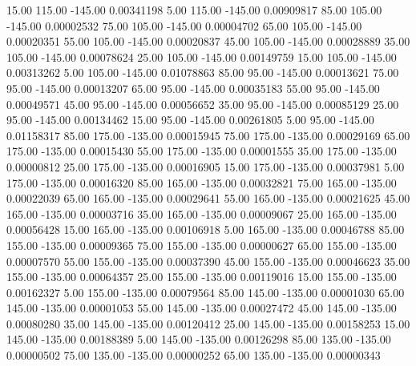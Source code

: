      15.00    115.00   -145.00     0.00341198
      5.00    115.00   -145.00     0.00909817
     85.00    105.00   -145.00     0.00002532
     75.00    105.00   -145.00     0.00004702
     65.00    105.00   -145.00     0.00020351
     55.00    105.00   -145.00     0.00020837
     45.00    105.00   -145.00     0.00028889
     35.00    105.00   -145.00     0.00078624
     25.00    105.00   -145.00     0.00149759
     15.00    105.00   -145.00     0.00313262
      5.00    105.00   -145.00     0.01078863
     85.00     95.00   -145.00     0.00013621
     75.00     95.00   -145.00     0.00013207
     65.00     95.00   -145.00     0.00035183
     55.00     95.00   -145.00     0.00049571
     45.00     95.00   -145.00     0.00056652
     35.00     95.00   -145.00     0.00085129
     25.00     95.00   -145.00     0.00134462
     15.00     95.00   -145.00     0.00261805
      5.00     95.00   -145.00     0.01158317
     85.00    175.00   -135.00     0.00015945
     75.00    175.00   -135.00     0.00029169
     65.00    175.00   -135.00     0.00015430
     55.00    175.00   -135.00     0.00001555
     35.00    175.00   -135.00     0.00000812
     25.00    175.00   -135.00     0.00016905
     15.00    175.00   -135.00     0.00037981
      5.00    175.00   -135.00     0.00016320
     85.00    165.00   -135.00     0.00032821
     75.00    165.00   -135.00     0.00022039
     65.00    165.00   -135.00     0.00029641
     55.00    165.00   -135.00     0.00021625
     45.00    165.00   -135.00     0.00003716
     35.00    165.00   -135.00     0.00009067
     25.00    165.00   -135.00     0.00056428
     15.00    165.00   -135.00     0.00106918
      5.00    165.00   -135.00     0.00046788
     85.00    155.00   -135.00     0.00009365
     75.00    155.00   -135.00     0.00000627
     65.00    155.00   -135.00     0.00007570
     55.00    155.00   -135.00     0.00037390
     45.00    155.00   -135.00     0.00046623
     35.00    155.00   -135.00     0.00064357
     25.00    155.00   -135.00     0.00119016
     15.00    155.00   -135.00     0.00162327
      5.00    155.00   -135.00     0.00079564
     85.00    145.00   -135.00     0.00001030
     65.00    145.00   -135.00     0.00001053
     55.00    145.00   -135.00     0.00027472
     45.00    145.00   -135.00     0.00080280
     35.00    145.00   -135.00     0.00120412
     25.00    145.00   -135.00     0.00158253
     15.00    145.00   -135.00     0.00188389
      5.00    145.00   -135.00     0.00126298
     85.00    135.00   -135.00     0.00000502
     75.00    135.00   -135.00     0.00000252
     65.00    135.00   -135.00     0.00000343
